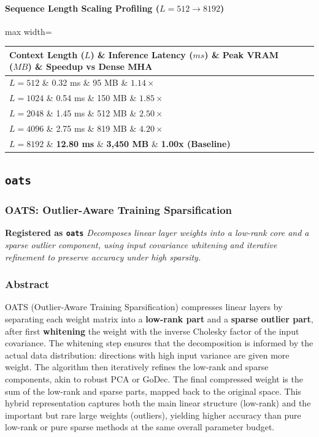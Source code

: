 \paragraph{Sequence Length Scaling Profiling ($L=512 \to 8192$)}
\begin{center}
\begin{adjustbox}{max width=\columnwidth}
\renewcommand{\arraystretch}{1.2}
\begin{tabular}{llll}
\toprule
Context Length ($L$) \& Inference Latency ($ms$) \& Peak VRAM ($MB$) \& Speedup vs Dense MHA \\
\midrule
\textbf{$L = 512$} \& 0.32 ms \& 95 MB \& $1.14\times$ \\
\textbf{$L = 1024$} \& 0.54 ms \& 150 MB \& $1.85\times$ \\
\textbf{$L = 2048$} \& 1.45 ms \& 512 MB \& $2.50\times$ \\
\textbf{$L = 4096$} \& 2.75 ms \& 819 MB \& $4.20\times$ \\
\textbf{$L = 8192$} \& \textbf{12.80 ms} \& \textbf{3,450 MB} \& \textbf{1.00x (Baseline)} \\


\bottomrule
\end{tabular}
\end{adjustbox}
\end{center}

\subsection{\texttt{oats}}
\subsubsection*{OATS: Outlier-Aware Training Sparsification}

\textbf{Registered as \texttt{oats}}
\textit{Decomposes linear layer weights into a low-rank core and a sparse outlier component, using input covariance whitening and iterative refinement to preserve accuracy under high sparsity.}


\subsubsection*{Abstract}

OATS (Outlier-Aware Training Sparsification) compresses linear layers by separating each weight matrix into a \textbf{low-rank part} and a \textbf{sparse outlier part}, after first \textbf{whitening} the weight with the inverse Cholesky factor of the input covariance. The whitening step ensures that the decomposition is informed by the actual data distribution: directions with high input variance are given more weight. The algorithm then iteratively refines the low-rank and sparse components, akin to robust PCA or GoDec. The final compressed weight is the sum of the low-rank and sparse parts, mapped back to the original space. This hybrid representation captures both the main linear structure (low-rank) and the important but rare large weights (outliers), yielding higher accuracy than pure low-rank or pure sparse methods at the same overall parameter budget.

